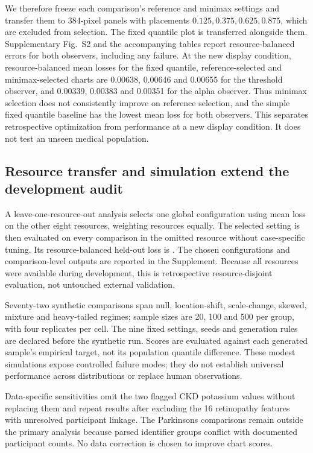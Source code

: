 \documentclass[11pt]{article}
\begin{document}
We therefore freeze each comparison's reference and minimax settings and transfer them to 384-pixel panels with placements $0.125,0.375,0.625,0.875$, which are excluded from selection. The fixed quantile plot is transferred alongside them. Supplementary Fig.~S2 and the accompanying tables report resource-balanced errors for both observers, including any failure. At the new display condition, resource-balanced mean losses for the fixed quantile, reference-selected and minimax-selected charts are 0.00638, 0.00646 and 0.00655 for the threshold observer, and 0.00339, 0.00383 and 0.00351 for the alpha observer. Thus minimax selection does not consistently improve on reference selection, and the simple fixed quantile baseline has the lowest mean loss for both observers. This separates retrospective optimization from performance at a new display condition. It does not test an unseen medical population.

\subsection*{Resource transfer and simulation extend the development audit}
A leave-one-resource-out analysis selects one global configuration using mean loss on the other eight resources, weighting resources equally. The selected setting is then evaluated on every comparison in the omitted resource without case-specific tuning. Its resource-balanced held-out loss is \TransferLoss{}. The chosen configurations and comparison-level outputs are reported in the Supplement. Because all resources were available during development, this is retrospective resource-disjoint evaluation, not untouched external validation.

Seventy-two synthetic comparisons span null, location-shift, scale-change, skewed, mixture and heavy-tailed regimes; sample sizes are 20, 100 and 500 per group, with four replicates per cell. The nine fixed settings, seeds and generation rules are declared before the synthetic run. Scores are evaluated against each generated sample's empirical target, not its population quantile difference. These modest simulations expose controlled failure modes; they do not establish universal performance across distributions or replace human observations.

Data-specific sensitivities omit the two flagged CKD potassium values without replacing them and repeat results after excluding the 16 retinopathy features with unresolved participant linkage. The Parkinsons comparisons remain outside the primary analysis because parsed identifier groups conflict with documented participant counts. No data correction is chosen to improve chart scores.
\end{document}
